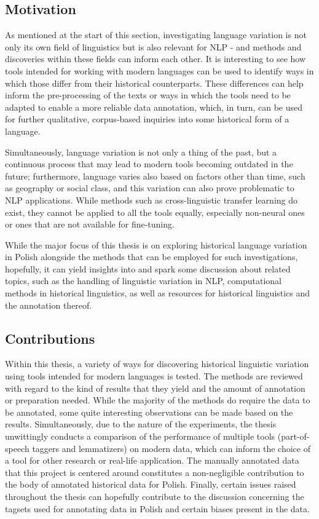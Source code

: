 \subsection{Motivation}
\label{subsec:motivation}

As mentioned at the start of this section, investigating language variation is not only its own field of linguistics but is also relevant for NLP - and methods and discoveries within these fields can inform each other. It is interesting to see how tools intended for working with modern languages can be used to identify ways in which those differ from their historical counterparts. These differences can help inform the pre-processing of the texts or ways in which the tools need to be adapted to enable a more reliable data annotation, which, in turn, can be used for further qualitative, corpus-based inquiries into some historical form of a language. 

Simultaneously, language variation is not only a thing of the past, but a continuous process that may lead to modern tools becoming outdated in the future; furthermore, language varies also based on factors other than time, such as geography or social class, and this variation can also prove problematic to NLP applications. While methods such as cross-linguistic transfer learning do exist, they cannot be applied to all the tools equally, especially non-neural ones or ones that are not available for fine-tuning.

While the major focus of this thesis is on exploring historical language variation in Polish alongside the methods that can be employed for such investigations, hopefully, it can yield insights into and spark some discussion about related topics, such as the handling of linguistic variation in NLP, computational methods in historical linguistics, as well as resources for historical linguistics and the annotation thereof.

\subsection{Contributions}
\label{subsec:contributions}

Within this thesis, a variety of ways for discovering historical linguistic variation using tools intended for modern languages is tested. The methods are reviewed with regard to the kind of results that they yield and the amount of annotation or preparation needed. While the majority of the methods do require the data to be annotated, some quite interesting observations can be made based on the results. Simultaneously, due to the nature of the experiments, the thesis unwittingly conducts a comparison of the performance of multiple tools (part-of-speech taggers and lemmatizers) on modern data, which can inform the choice of a tool for other research or real-life application. The manually annotated data that this project is centered around constitutes a non-negligible contribution to the body of annotated historical data for Polish. Finally, certain issues raised throughout the thesis can hopefully contribute to the discussion concerning the tagsets used for annotating data in Polish and certain biases present in the data.

